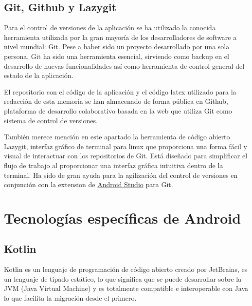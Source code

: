 \subsection{Git, Github y Lazygit}
Para el control de versiones de la aplicación se ha utilizado la conocida herramienta utilizada por la gran mayoría de los desarrolladores de software a nivel mundial:
Git\hyperlink{cap:biblio}{}. Pese a haber sido un proyecto desarrollado por una sola persona, Git ha sido una herramienta esencial, sirviendo como backup en el desarrollo de nuevas funcionalidades así como herramienta de control general del estado de la aplicación. 

El repositorio con el código de la aplicación y el código latex utilizado para la redacción de esta memoria se han almacenado de forma pública en 
Github\hyperlink{cap:biblio}{}, plataforma de desarrollo colaborativo basada en la web que utiliza Git como sistema de control de versiones.

También merece mención en este apartado la herramienta de código abierto Lazygit\hyperlink{cap:biblio}{}, interfaz gráfico de terminal para linux que proporciona una forma fácil y visual de interactuar con los repositorios de Git. Está diseñado para simplificar el flujo de trabajo al proporcionar una interfaz gráfica intuitiva dentro de la terminal. Ha sido de gran ayuda para la agilización del control de versiones en conjunción con la extension de \hyperlink{subsec:android_studio}{Android Studio} para Git.
\section{Tecnologías específicas de Android}

\hypertarget{subsec:kotlin}{}
\subsection{Kotlin}
Kotlin\hyperlink{cap:biblio}{} es un lenguaje de programación de código abierto creado por JetBrains, es un lenguaje de tipado estático, lo que significa que se puede desarrollar sobre la JVM (Java Virtual Machine) y es totalmente compatible e interoperable con Java lo que facilita la migración desde el primero. 

